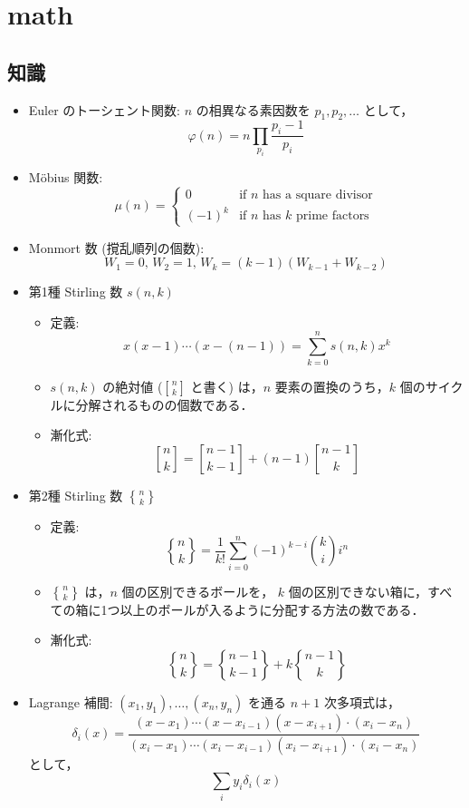 \section{math}

\subsection{知識}
\begin{small}
\begin{itemize}
    \item Euler のトーシェント関数:
    $n$ の相異なる素因数を $p_1,p_2,\dots$ として，
    \[\varphi(n)=n\prod_{p_i} \frac{p_i-1}{p_i}\]

    \item Möbius 関数:
    \[\mu(n)=\begin{cases} 0 & \text{if $n$ has a square divisor} \\ (-1)^k & \text{if $n$ has $k$ prime factors} \end{cases}\]

    \item Monmort 数 (撹乱順列の個数):
    \[W_1=0,\,W_2=1,\,W_k=(k-1)(W_{k-1}+W_{k-2})\]

    \item 第1種 Stirling 数 $s(n,k)$
    \begin{itemize}
        \item 定義: \[x(x-1)\cdots(x-(n-1)) = \sum_{k=0}^n s(n,k) x^k\]
        \item $s(n,k)$ の絶対値 (${n \brack k}$ と書く) は，$n$ 要素の置換のうち，$k$ 個のサイクルに分解されるものの個数である．
        \item 漸化式: \[{n\brack k} = {n-1\brack k-1} + (n-1){n-1 \brack k}\]
    \end{itemize}

    \item 第2種 Stirling 数 ${n \brace k}$
    \begin{itemize}
        \item 定義: \[{n \brace k} = \frac{1}{k!} \sum_{i=0}^n (-1)^{k-i} \binom{k}{i} i^n\]
        \item ${n \brace k}$ は，$n$ 個の区別できるボールを， $k$ 個の区別できない箱に，すべての箱に1つ以上のボールが入るように分配する方法の数である．
        \item 漸化式: \[{n\brace k} = {n-1\brace k-1} + k{n-1 \brace k}\]
    \end{itemize}

    \item Lagrange 補間:
    $(x_1,y_1),\dots,(x_n,y_n)$ を通る $n+1$ 次多項式は，
    \[\delta_i(x)=\frac{(x-x_1)\cdots(x-x_{i-1})(x-x_{i+1})\cdot(x_i-x_n)}{(x_i-x_1)\cdots(x_i-x_{i-1})(x_i-x_{i+1})\cdot(x_i-x_n)}\]
    として，
    \[\sum_i y_i \delta_i(x)\]
\end{itemize}
\end{small}

